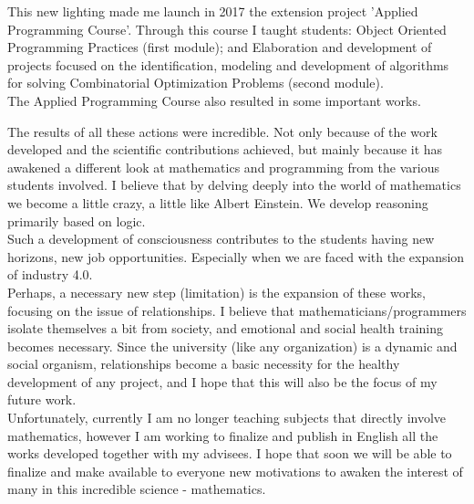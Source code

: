 \documentclass{book}
\begin{document}
This new lighting made me launch in 2017 the extension project 'Applied Programming Course'. Through this course I taught students: Object Oriented Programming Practices (first module); and Elaboration and development of projects focused on the identification, modeling and development of algorithms for solving Combinatorial Optimization Problems (second module). \\

The Applied Programming Course also resulted in some important works.

The results of all these actions were incredible. Not only because of the work developed and the scientific contributions achieved, but mainly because it has awakened a different look at mathematics and programming from the various students involved. I believe that by delving deeply into the world of mathematics we become a little crazy, a little like Albert Einstein. We develop reasoning primarily based on logic. \\

Such a development of consciousness contributes to the students having new horizons, new job opportunities. Especially when we are faced with the expansion of industry 4.0. \\

Perhaps, a necessary new step (limitation) is the expansion of these works, focusing on the issue of relationships. I believe that mathematicians/programmers isolate themselves a bit from society, and emotional and social health training becomes necessary. Since the university (like any organization) is a dynamic and social organism, relationships become a basic necessity for the healthy development of any project, and I hope that this will also be the focus of my future work. \\

Unfortunately, currently I am no longer teaching subjects that directly involve mathematics, however I am working to finalize and publish in English all the works developed together with my advisees. I hope that soon we will be able to finalize and make available to everyone new motivations to awaken the interest of many in this incredible science - mathematics. 




\end{document}

